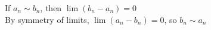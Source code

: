 \documentclass[preview]{standalone}
\begin{document}
\begin{center}
If $a_n \sim b_n$, then $\lim (b_n - a_n) = 0$\\By symmetry of limits, $\lim (a_n - b_n) = 0$, so $b_n \sim a_n$
\end{center}
\end{document}
